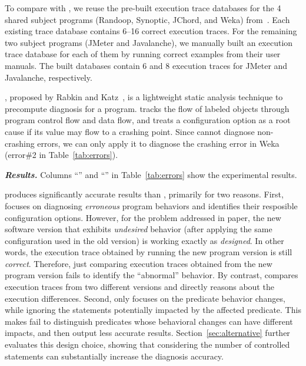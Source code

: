 To compare \ourtool with \prevtool, 
we reuse the pre-built execution trace databases
for the 4 shared subject programs (Randoop, Synoptic, JChord, and Weka)
from~\cite{Zhang:2013:ADS}.
Each existing trace database contains 6--16 correct
execution traces.
For the remaining two subject programs (JMeter and
Javalanche), we manually built an execution trace database
for each of them by running correct examples from their user manuals.
The built databases contain 6 and 8
execution traces for JMeter and Javalanche, respectively.

\vspace{1mm}

\noindent \textbf{\conftoolnoxspace}, proposed by Rabkin and
Katz~\cite{Rabkin:2011:PPC}, is a lightweight
static analysis technique to precompute diagnosis for a program.
\conftool tracks the flow of labeled objects through 
program control flow and data flow, and treats a configuration option
as a root cause if its value may flow to a crashing point.
Since \conftool cannot diagnose non-crashing errors, we
can only apply it to diagnose the crashing error in
Weka (error\#2 in Table~\ref{tab:errors}).


\vspace{1mm}
\noindent \textbf{\textit{Results.}}
Columns ``\prevtool'' and ``\conftool'' in Table~\ref{tab:errors} show
the experimental results.

\ourtool produces significantly accurate results than \prevtool,
primarily for two reasons. First, \prevtool focuses on diagnosing
\textit{erroneous} program behaviors and identifies their resposible
configuration options. However, for the problem addressed in paper,
the new software version that exhibits \textit{undesired} behavior 
(after applying the same configuration used in the old version)
is working exactly as \textit{designed}. In other words, the execution
trace obtained by running the new program version is still
\textit{correct}. Therefore, just comparing execution traces obtained
from the new program version fails to identify
the ``abnormal'' behavior. By contrast, \ourtool compares execution
traces from two different versions and directly reasons about the
execution differences. Second, \prevtool only focuses on
the predicate behavior changes, while ignoring the statements
potentially impacted by the affected predicate. This makes
\prevtool fail to distinguish predicates whose behavioral changes can
have different impacts, and then output less accurate results.
Section~\ref{sec:alternative} further evaluates this design
choice, showing that considering the number of controlled statements
can substantially increase the diagnosis accuracy.

